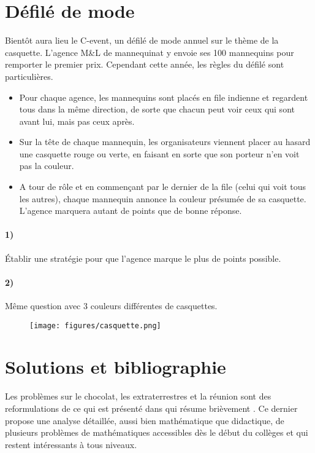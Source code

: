 \documentclass[a4paper,10pt,oneside]{article}
\begin{document}
\clearpage
\section{Défilé de mode}

Bientôt aura lieu le C-event, un défilé de mode annuel sur le thème de la casquette.
L'agence M\&L de mannequinat y envoie ses 100 mannequins pour remporter le premier prix.
Cependant cette année, les règles du défilé sont particulières.
\begin{itemize}
  \item Pour chaque agence, les mannequins sont placés en file indienne et regardent tous dans la même direction, de sorte que chacun peut voir ceux qui sont avant lui, mais pas ceux après.
  \item Sur la tête de chaque mannequin, les organisateurs viennent placer au hasard une casquette rouge ou verte, en faisant en sorte que son porteur n'en voit pas la couleur.
  \item A tour de rôle et en commençant par le dernier de la file (celui qui voit tous les autres), chaque mannequin annonce la couleur présumée de sa casquette. L'agence marquera autant de points que de bonne réponse.
\end{itemize}

\paragraph*{1)}
Établir une stratégie pour que l'agence marque le plus de points possible.

\paragraph*{2)}
Même question avec $3$ couleurs différentes de casquettes.


\vspace{3cm}
\begin{figure}[!ht]
  \centering
  \texttt{[image: figures/casquette.png]}
  \caption*{}
\end{figure}



\clearpage
\section*{Solutions et bibliographie}

Les problèmes sur le chocolat, les extraterrestres et la réunion sont des reformulations de ce qui est présenté dans \cite{grenierMathematiquesDiscretesMine2018} qui résume brièvement \cite{grenierSituationsRecherchePour2017}.
Ce dernier propose une analyse détaillée, aussi bien mathématique que didactique, de plusieurs problèmes de mathématiques accessibles dès le début du collèges et qui restent intéressants à tous niveaux.
\end{document}
